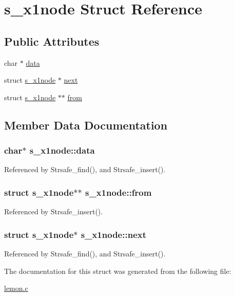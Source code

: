 \hypertarget{structs__x1node}{\section{s\-\_\-x1node Struct Reference}
\label{structs__x1node}
}
\subsection*{Public Attributes}
\begin{DoxyCompactItemize}
\item 
char $\ast$ \hyperlink{structs__x1node_a3463fe2f9423040f15c8e2f6f5611589}{data}
\item 
struct \hyperlink{structs__x1node}{s\-\_\-x1node} $\ast$ \hyperlink{structs__x1node_a37cd457ffb6ec518eda9d8f09e777f37}{next}
\item 
struct \hyperlink{structs__x1node}{s\-\_\-x1node} $\ast$$\ast$ \hyperlink{structs__x1node_aef4939f8207e194f9c1f638746506e06}{from}
\end{DoxyCompactItemize}


\subsection{Member Data Documentation}
\hypertarget{structs__x1node_a3463fe2f9423040f15c8e2f6f5611589}{
\subsubsection[{data}]{\setlength{\rightskip}{0pt plus 5cm}char$\ast$ s\-\_\-x1node\-::data}}\label{structs__x1node_a3463fe2f9423040f15c8e2f6f5611589}


Referenced by Strsafe\-\_\-find(), and Strsafe\-\_\-insert().

\hypertarget{structs__x1node_aef4939f8207e194f9c1f638746506e06}{
\subsubsection[{from}]{\setlength{\rightskip}{0pt plus 5cm}struct {\bf s\-\_\-x1node}$\ast$$\ast$ s\-\_\-x1node\-::from}}\label{structs__x1node_aef4939f8207e194f9c1f638746506e06}


Referenced by Strsafe\-\_\-insert().

\hypertarget{structs__x1node_a37cd457ffb6ec518eda9d8f09e777f37}{
\subsubsection[{next}]{\setlength{\rightskip}{0pt plus 5cm}struct {\bf s\-\_\-x1node}$\ast$ s\-\_\-x1node\-::next}}\label{structs__x1node_a37cd457ffb6ec518eda9d8f09e777f37}


Referenced by Strsafe\-\_\-find(), and Strsafe\-\_\-insert().



The documentation for this struct was generated from the following file\-:\begin{DoxyCompactItemize}
\item 
\hyperlink{lemon_8c}{lemon.\-c}\end{DoxyCompactItemize}
